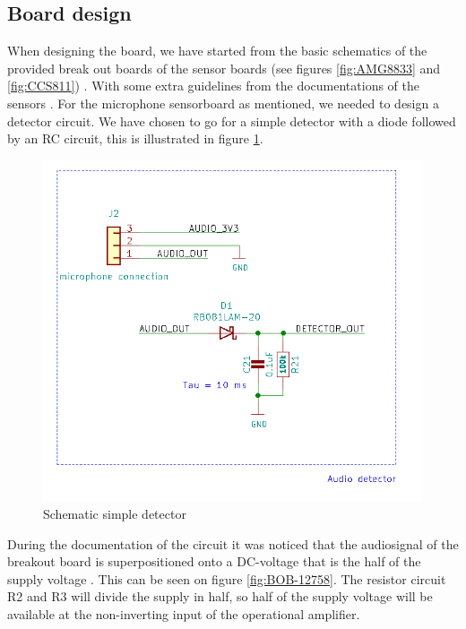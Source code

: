\documentclass[11pt,a4paper]{article}
\begin{document}
\subsection{Board design}
When designing the board, we have started from the basic schematics of the provided break out boards of the sensor boards (see figures \ref{fig:AMG8833} and \ref{fig:CCS811}) \cite{bib:AMG8833_schematic} \cite{bib:CCS811_schematic}. With some extra guidelines from the documentations of the sensors  \cite{bib:AMG8833} \cite{bib:CCS811}. For the microphone sensorboard as mentioned, we needed to design a detector circuit. We have chosen to go for a simple detector with a diode followed by an RC circuit, this is illustrated in figure \ref{fig:simple_detector}.
\begin{figure}[H]
	\centering
	\includegraphics[width=0.8\linewidth]{Schematic_audio_detector.png}
	\caption{Schematic simple detector \cite{bib:breakout_microphone}}
	\label{fig:simple_detector}
\end{figure}
During the documentation of the circuit it was noticed that the audiosignal of the breakout board is superpositioned onto a DC-voltage that is the half of the supply voltage \cite{bib:breakout_microphone}. This can be seen on figure \ref{fig:BOB-12758}. The resistor circuit R2 and R3 will divide the supply in half, so half of the supply voltage will be available at the non-inverting input of the operational amplifier.
\end{document}
